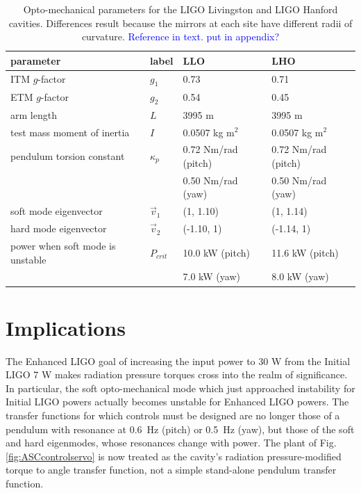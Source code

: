 \begin{table}
\centering
\caption[Opto-mechanical parameters for the LIGO Livingston and LIGO
 Hanford cavities]{Opto-mechanical parameters for the LIGO Livingston and LIGO
 Hanford cavities. Differences result because the mirrors at each site have different
 radii of curvature. \textcolor{blue}{Reference in text. put in appendix?}}
\begin{tabular}{l l l l}
\hline
parameter & label & LLO & LHO \\
\hline
ITM $g$-factor & $g_1$ & 0.73 & 0.71 \\
ETM $g$-factor & $g_2$ & 0.54 & 0.45 \\
arm length & $L$ & 3995 m & 3995 m \\
test mass moment of inertia & $I$ & 0.0507 kg m$^2$ &  0.0507 kg m$^2$ \\
pendulum torsion constant & $\kappa_p$ & 0.72 Nm/rad (pitch)& 0.72 Nm/rad (pitch) \\ 
& & 0.50 Nm/rad (yaw) & 0.50 Nm/rad (yaw) \\
soft mode eigenvector & $\vec{v}_1$ & (1, 1.10) & (1, 1.14) \\
hard mode eigenvector & $\vec{v}_2$ & (-1.10, 1) & (-1.14, 1) \\
power when soft mode is unstable & $P_{crit}$ & 10.0 kW (pitch) & 11.6 kW (pitch)\\
& & 7.0 kW (yaw) & 8.0 kW (yaw) \\
\hline
\end{tabular}
\label{table:}
\end{table}




\section{Implications}
The Enhanced LIGO goal of increasing the input power to 30 W from the
Initial LIGO 7 W makes radiation pressure torques cross into the realm
of significance. In particular, the soft opto-mechanical mode which
just approached instability for Initial LIGO powers actually becomes
unstable for Enhanced LIGO powers. The transfer functions for which
controls must be designed are no longer those of a pendulum with
resonance at 0.6~Hz (pitch) or 0.5~Hz (yaw), but those of the soft and
hard eigenmodes, whose resonances change with power. The plant of
Fig. \ref{fig:ASCcontrolservo} is now treated as the cavity's radiation
pressure-modified torque to angle transfer function, not a simple
stand-alone pendulum transfer function.

